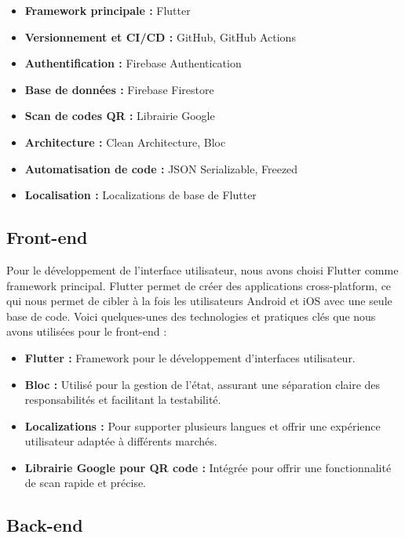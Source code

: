 \begin{itemize}[noitemsep]
    \item \textbf{Framework principale :} Flutter
    \item \textbf{Versionnement et CI/CD :} GitHub, GitHub Actions
    \item \textbf{Authentification :} Firebase Authentication
    \item \textbf{Base de données :} Firebase Firestore
    \item \textbf{Scan de codes QR :} Librairie Google
    \item \textbf{Architecture :} Clean Architecture, Bloc
    \item \textbf{Automatisation de code :} JSON Serializable, Freezed
    \item \textbf{Localisation :} Localizations de base de Flutter
\end{itemize}

\subsection{Front-end}

Pour le développement de l'interface utilisateur, nous avons choisi Flutter comme framework principal. Flutter permet de créer des applications cross-platform, ce qui nous permet de cibler à la fois les utilisateurs Android et iOS avec une seule base de code. Voici quelques-unes des technologies et pratiques clés que nous avons utilisées pour le front-end :

\begin{itemize}[noitemsep]
    \item \textbf{Flutter :} Framework pour le développement d'interfaces utilisateur.
    \item \textbf{Bloc :} Utilisé pour la gestion de l'état, assurant une séparation claire des responsabilités et facilitant la testabilité.
    \item \textbf{Localizations :} Pour supporter plusieurs langues et offrir une expérience utilisateur adaptée à différents marchés.
    \item \textbf{Librairie Google pour QR code :} Intégrée pour offrir une fonctionnalité de scan rapide et précise.
\end{itemize}

\subsection{Back-end}


